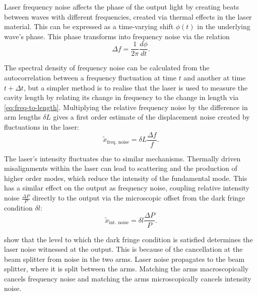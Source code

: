 Laser frequency noise affects the phase of the output light by creating beats between waves with different frequencies, created via thermal effects in the laser material. This can be expressed as a time-varying shift $\phi \left( t \right)$ in the underlying wave's phase. This phase transforms into frequency noise via the relation
\begin{equation}
  \Delta f = \frac{1}{2 \pi} \frac{d \phi}{dt}.
\end{equation}

The spectral density of frequency noise can be calculated from the autocorrelation between a frequency fluctuation at time $t$ and another at time $t + \Delta t$, but a simpler method is to realise that the laser is used to measure the cavity length by relating its change in frequency to the change in length via \cref{eq:freq-to-length}. Multiplying the relative frequency noise by the difference in arm lengths $\delta L$ gives a first order estimate of the displacement noise created by fluctuations in the laser:
\begin{equation}
  \label{eq:laser-freq-noise}
  \tilde{x}_{\text{freq. noise}} = \delta L \frac{\Delta f}{f}.
\end{equation}

The laser's intensity fluctuates due to similar mechanisms. Thermally driven misalignments within the laser can lead to scattering and the production of higher order modes, which reduce the intensity of the fundamental mode. This has a similar effect on the output as frequency noise, coupling relative intensity noise $\frac{\Delta P}{P}$ directly to the output via the microscopic offset from the dark fringe condition $\delta l$:
\begin{equation}
  \label{eq:laser-int-noise}
  \tilde{x}_{\text{int. noise}} = \delta l \frac{\Delta P}{P}.
\end{equation}

 show that the level to which the dark fringe condition is satisfied determines the laser noise witnessed at the output. This is because of the cancellation at the beam splitter from noise in the two arms. Laser noise propagates to the beam splitter, where it is split between the arms. Matching the arms macroscopically cancels frequency noise and matching the arms microscopically cancels intensity noise.

